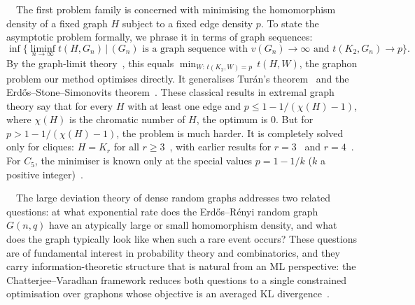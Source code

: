 \documentclass{article}
\theoremstyle{plain}
\theoremstyle{definition}
\theoremstyle{remark}
\begin{document}
\ $\,$
The first problem family is concerned with minimising the homomorphism density of a fixed graph $H$ subject to a fixed edge density $p$. To state the asymptotic problem formally, we phrase it in terms of graph sequences:
\begin{equation}
\label{eqn:extremalproblem:generalisedTuran}
\inf\Big\{\liminf_{n \to \infty} t(H, G_n) \,\Big|\, \text{$(G_n)$ is a graph sequence with } v(G_n)\to\infty \text{ and } t(K_2, G_n)\to p\Big\}.
\end{equation}
By the graph-limit theory~\citep{lovasz2012large}, this equals $\min_{W:\,t(K_2,W)=p}\, t(H, W)$, the graphon problem our method optimises directly.
It generalises Tur\'an's theorem~\citep{turan1941eine}
and the Erd\H{o}s--Stone--Simonovits theorem~\citep{erdos1946structure, erdos1966limit}. These classical results in extremal graph theory say
that for every $H$ with at least one edge and $p \leq 1 - 1/(\chi(H) - 1)$, where $\chi(H)$ is the chromatic number of $H$, the optimum is $0$. But for $p > 1 - 1/(\chi(H) - 1)$, the problem is much harder. It is completely solved only for cliques: $H = K_r$ for all $r \ge 3$~\citep{reiher2016clique}, with earlier results for $r = 3$~\citep{razborov2008minimal} and $r = 4$~\citep{nikiforov2011number}. For $C_5$, the minimiser is known only at the special values $p = 1 - 1/k$ ($k$ a positive integer)~\citep{bennett2020minimizing}.

\ $\,$
The large deviation theory of dense random graphs addresses two related questions: at what exponential rate does the Erd\H{o}s--R\'enyi random graph $G(n,q)$ have an atypically large or small homomorphism density, and what does the graph typically look like when such a rare event occurs?
These questions are of fundamental interest in probability theory and combinatorics, and they carry information-theoretic structure that is natural from an ML perspective: the Chatterjee--Varadhan framework reduces both questions to a single constrained optimisation over graphons whose objective is an averaged KL divergence~\citep{chatterjee2011large}.
\end{document}
